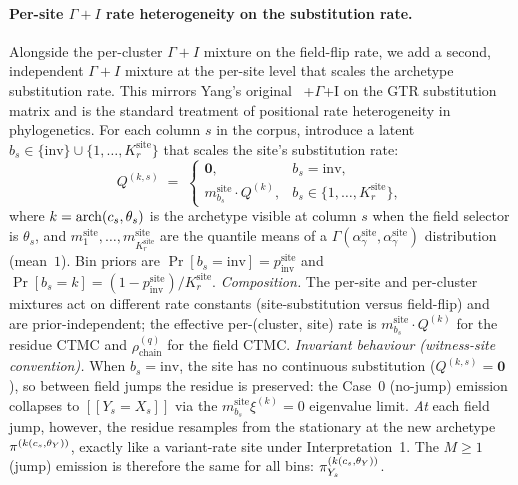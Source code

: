 \paragraph{Per-site $\Gamma+I$ rate heterogeneity on the substitution
rate.}
\label{par:arch-gamma-plus-I-persite}
Alongside the per-cluster $\Gamma+I$ mixture on the field-flip rate,
we add a second, independent $\Gamma+I$ mixture at the per-site level
that scales the archetype substitution rate. This mirrors Yang's
original~\citep{yang1994maximum} +$\Gamma$+I on the GTR substitution
matrix and is the standard treatment of positional rate heterogeneity
in phylogenetics.
%
For each column $s$ in the corpus, introduce a latent
$b_s \in \{\mathrm{inv}\} \cup \{1, \dots, K_r^{\mathrm{site}}\}$ that
scales the site's substitution rate:
\begin{equation}
  Q^{(k, s)} \;=\;
    \begin{cases}
      \mathbf{0}, & b_s = \mathrm{inv},\\
      m^{\mathrm{site}}_{b_s} \cdot Q^{(k)}, & b_s \in \{1, \dots, K_r^{\mathrm{site}}\},
    \end{cases}
  \label{eq:arch-persite-rate-het}
\end{equation}
where $k = \mathrm{arch}(c_s, \theta_s)$ is the archetype visible at column
$s$ when the field selector is $\theta_s$, and
$m^{\mathrm{site}}_{1}, \dots, m^{\mathrm{site}}_{K_r^{\mathrm{site}}}$
are the quantile means of a
$\Gamma(\alpha^{\mathrm{site}}_\gamma, \alpha^{\mathrm{site}}_\gamma)$
distribution (mean~$1$). Bin priors are
$\Pr[b_s = \mathrm{inv}] = p^{\mathrm{site}}_{\mathrm{inv}}$ and
$\Pr[b_s = k] = (1 - p^{\mathrm{site}}_{\mathrm{inv}})/K_r^{\mathrm{site}}$.
%
\emph{Composition.} The per-site and per-cluster mixtures act on
different rate constants (site-substitution versus field-flip) and
are prior-independent; the effective per-(cluster, site) rate is
$m^{\mathrm{site}}_{b_s} \cdot Q^{(k)}$ for the residue CTMC and
$\rho^{(q)}_{\text{chain}}$ for the field CTMC.
%
\emph{Invariant behaviour (witness-site convention).} When
$b_s = \mathrm{inv}$, the site has no continuous substitution
($Q^{(k, s)} = \mathbf{0}$), so between field jumps the residue is
preserved: the Case~0 (no-jump) emission collapses to
$[\![ Y_s = X_s ]\!]$ via the $m^{\mathrm{site}}_{b_s} \xi^{(k)} = 0$
eigenvalue limit. \emph{At} each field jump, however, the residue
resamples from the stationary at the new archetype
$\pi^{(k(c_s, \theta_Y))}$, exactly like a variant-rate site under
Interpretation~1. The $M{\geq}1$ (jump) emission is therefore the
same for all bins: $\pi^{(k(c_s, \theta_Y))}_{Y_s}$.
